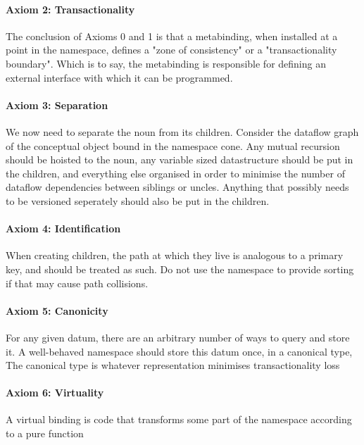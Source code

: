 \documentclass[twoside]{report}
\begin{document}
\paragraph{Axiom 2: Transactionality}

The conclusion of Axioms 0 and 1 is that a metabinding, when installed at a point in the namespace, defines a "zone of consistency" or a "transactionality boundary". Which is to say, the metabinding is responsible for defining an external interface with which it can be programmed.

\paragraph{Axiom 3: Separation}

We now need to separate the noun from its children. Consider the dataflow graph of the conceptual object bound in the namespace cone. Any mutual recursion should be hoisted to the noun, any variable sized datastructure should be put in the children, and everything else organised in order to minimise the number of dataflow dependencies between siblings or uncles. Anything that possibly needs to be versioned seperately should also be put in the children.

\paragraph{Axiom 4: Identification}

When creating children, the path at which they live is analogous to a primary key, and should be treated as such. Do not use the namespace to provide sorting if that may cause path collisions.

\paragraph{Axiom 5: Canonicity}

For any given datum, there are an arbitrary number of ways to query and store it. A well-behaved namespace should store this datum once, in a canonical type, The canonical type is whatever representation minimises transactionality loss

\paragraph{Axiom 6: Virtuality}

A virtual binding is code that transforms some part of the namespace according to a pure function
\end{document}
